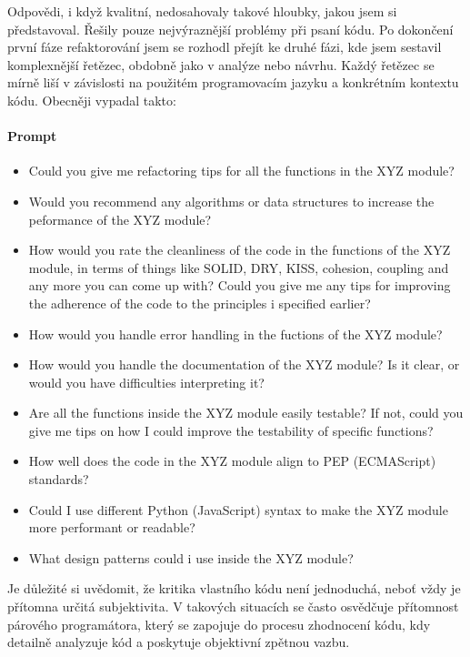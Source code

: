 \documentclass[FM,DP]{tulthesis}
\begin{document}
		Odpovědi, i když kvalitní, nedosahovaly takové hloubky, jakou jsem si představoval. Řešily pouze nejvýraznější problémy při psaní kódu. Po dokončení první fáze refaktorování jsem se rozhodl přejít ke druhé fázi, kde jsem sestavil komplexnější řetězec, obdobně jako v analýze nebo návrhu. Každý řetězec se mírně liší v závislosti na použitém programovacím jazyku a konkrétním kontextu kódu. Obecněji vypadal takto:
		\vspace{0.6em}
		\begin{tcolorbox}[colback=white,colframe=black]
			\paragraph{Prompt}
			\begin{itemize}
				\item{Could you give me refactoring tips for all the functions in the XYZ module?}
				\item{Would you recommend any algorithms or data structures to increase the peformance of the XYZ module?}
				\item{How would you rate the cleanliness of the code in the functions of the XYZ module, in terms of things like SOLID, DRY, KISS, cohesion, coupling and any more you can come up with? Could you give me any tips for improving the adherence of the code to the principles i specified earlier?}
				\item{How would you handle error handling in the fuctions of the XYZ module?}
				\item{How would you handle the documentation of the XYZ module? Is it clear, or would you have difficulties interpreting it?}
				\item{Are all the functions inside the XYZ module easily testable? If not, could you give me tips on how I could improve the testability of specific functions?}
				\item{How well does the code in the XYZ module align to PEP (ECMAScript) standards?}
				\item{Could I use different Python (JavaScript) syntax to make the XYZ module more performant or readable?}
				\item{What design patterns could i use inside the XYZ module?}
			\end{itemize}
		\end{tcolorbox}
		
		Je důležité si uvědomit, že kritika vlastního kódu není jednoduchá, neboť vždy je přítomna určitá subjektivita. V takových situacích se často osvědčuje přítomnost párového programátora, který se zapojuje do procesu zhodnocení kódu, kdy detailně analyzuje kód a poskytuje objektivní zpětnou vazbu. 
		
\end{document}
